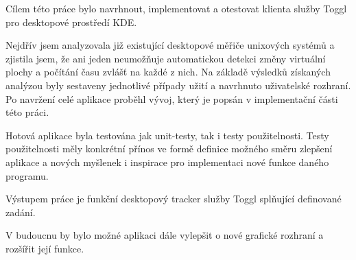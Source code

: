 \documentclass[thesis=B,czech]{FITthesis}[2012/06/26]
\begin{document}
\begin{conclusion}
Cílem této práce bylo navrhnout, implementovat a otestovat klienta služby Toggl pro desktopové prostředí KDE. \par
Nejdřív jsem analyzovala již existující desktopové měřiče unixových systémů a zjistila jsem, že ani jeden neumožňuje automatickou detekci změny virtuální plochy a počítání času zvlášť na každé z nich. Na základě výsledků získaných analýzou byly sestaveny jednotlivé případy užití a navrhnuto uživatelské rozhraní. Po navržení celé aplikace proběhl vývoj, který je popsán v implementační části této práci.\par
Hotová aplikace byla testována jak unit-testy, tak i testy použitelnosti. Testy použitelnosti měly konkrétní přínos ve formě definice možného směru zlepšení aplikace a nových myšlenek i inspirace pro implementaci nové funkce daného programu.\par
Výstupem práce je funkční desktopový tracker služby Toggl splňující definované zadání.\par
V budoucnu by bylo možné aplikaci dále vylepšit o nové grafické rozhraní a rozšířit její funkce. 

\end{conclusion}
\end{document}
